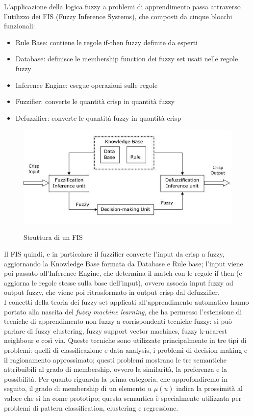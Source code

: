 \documentclass{article}
\begin{document}
	L'applicazione della logica fuzzy a problemi di apprendimento passa attraverso l'utilizzo dei FIS (Fuzzy Inference Systems), che composti da cinque blocchi funzionali: 
	\begin{itemize}
		\item{Rule Base}: contiene le regole if-then fuzzy definite da esperti
		\item{Database}: definisce le membership function dei fuzzy set usati nelle regole fuzzy
		\item{Inference Engine}: esegue operazioni sulle regole
		\item{Fuzzifier}: converte le quantità crisp in quantità fuzzy
		\item{Defuzzifier}: converte le quantità fuzzy in quantità crisp
	\end{itemize}
	\begin{figure}[h]
		\centering
		{\includegraphics[width=.80\textwidth]{fis.jpg}} \quad
		\caption{Struttura di un FIS}
		\label{fig:fis}
	\end{figure}

	Il FIS quindi, e in particolare il fuzzifier converte l'input da crisp a fuzzy, aggiornando la Knowledge Base formata da Database e Rule base; l'input viene poi passato all'Inference Engine, che determina il match con le regole if-then (e aggiorna le regole stesse sulla base dell'input), ovvero associa input fuzzy ad output fuzzy, che viene poi ritrasformato in output crisp dal defuzzifier.
	\\
	I concetti della teoria dei fuzzy set applicati all'apprendimento automatico hanno portato alla nascita del \textit{fuzzy machine learning}, che ha permesso l'estensione di tecniche di apprendimento non fuzzy a corrispondenti tecniche fuzzy: si può parlare di fuzzy clustering, fuzzy support vector machines, fuzzy k-nearest neighbour e così via. Queste tecniche sono utilizzate principalmente in tre tipi di problemi: quelli di classificazione e data analysis, i problemi di decision-making e il ragionamento approssimato; questi problemi mostrano le tre semantiche attribuibili al grado di membership, ovvero la similarità, la preferenza e la possibilità.
	Per quanto riguarda la prima categoria, che approfondiremo in seguito, il grado di membership di un elemento $u$ $\mu(u)$ indica la prossimità al valore che si ha come prototipo; questa semantica è specialmente utilizzata per problemi di pattern classification, clustering e regressione.
	
\end{document}

